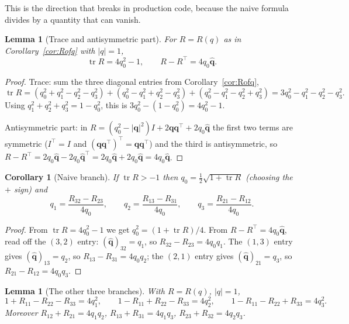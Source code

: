 \documentclass[11pt]{article}
\DeclareMathOperator{\tr}{tr}
\newcommand{\vv}[1]{\bm{#1}}
\newcommand{\hatmap}[1]{\widehat{#1}}
\theoremstyle{plain}
\newtheorem{lemma}[theorem]{Lemma}
\newtheorem{corollary}[theorem]{Corollary}
\theoremstyle{definition}
\begin{document}
This is the direction that breaks in production code, because the naive formula divides by a
quantity that can vanish.

\begin{lemma}[Trace and antisymmetric part]\label{lem:traceanti}
For $R=R(q)$ as in Corollary~\ref{cor:Rofq} with $|q|=1$,
\[
\tr R=4q_0^2-1 ,\qquad R-R^{\!\top}=4q_0\hatmap{\vv q}.
\]
\end{lemma}

\begin{proof}
Trace: sum the three diagonal entries from Corollary~\ref{cor:Rofq},
\[
\tr R=(q_0^2+q_1^2-q_2^2-q_3^2)+(q_0^2-q_1^2+q_2^2-q_3^2)+(q_0^2-q_1^2-q_2^2+q_3^2)
=3q_0^2-q_1^2-q_2^2-q_3^2 .
\]
Using $q_1^2+q_2^2+q_3^2=1-q_0^2$, this is $3q_0^2-(1-q_0^2)=4q_0^2-1$.

Antisymmetric part: in $R=(q_0^2-|\vv q|^2)I+2\vv q\vv q^{\!\top}+2q_0\hatmap{\vv q}$ the first two
terms are symmetric ($I^{\!\top}=I$ and $(\vv q\vv q^{\!\top})^{\!\top}=\vv q\vv q^{\!\top}$) and the
third is antisymmetric, so
$R-R^{\!\top}=2q_0\hatmap{\vv q}-2q_0\hatmap{\vv q}^{\!\top}=2q_0\hatmap{\vv q}+2q_0\hatmap{\vv q}
=4q_0\hatmap{\vv q}$.
\end{proof}

\begin{corollary}[Naive branch]\label{cor:naive}
If $\tr R>-1$ then $q_0=\tfrac12\sqrt{1+\tr R}$ (choosing the $+$ sign) and
\[
q_1=\frac{R_{32}-R_{23}}{4q_0},\qquad q_2=\frac{R_{13}-R_{31}}{4q_0},\qquad
q_3=\frac{R_{21}-R_{12}}{4q_0}.
\]
\end{corollary}

\begin{proof}
From $\tr R=4q_0^2-1$ we get $q_0^2=(1+\tr R)/4$. From $R-R^{\!\top}=4q_0\hatmap{\vv q}$, read off
the $(3,2)$ entry: $(\hatmap{\vv q})_{32}=q_1$, so $R_{32}-R_{23}=4q_0q_1$. The $(1,3)$ entry gives
$(\hatmap{\vv q})_{13}=q_2$, so $R_{13}-R_{31}=4q_0q_2$; the $(2,1)$ entry gives
$(\hatmap{\vv q})_{21}=q_3$, so $R_{21}-R_{12}=4q_0q_3$.
\end{proof}

\begin{lemma}[The other three branches]\label{lem:branches}
With $R=R(q)$, $|q|=1$,
\[
1+R_{11}-R_{22}-R_{33}=4q_1^2,\qquad
1-R_{11}+R_{22}-R_{33}=4q_2^2,\qquad
1-R_{11}-R_{22}+R_{33}=4q_3^2 .
\]
Moreover $R_{12}+R_{21}=4q_1q_2$, $R_{13}+R_{31}=4q_1q_3$, $R_{23}+R_{32}=4q_2q_3$.
\end{lemma}
\end{document}

